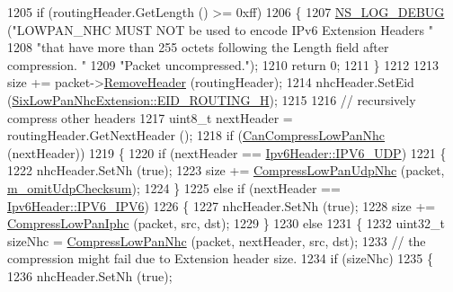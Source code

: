 \begin{DoxyCode}
1205       \textcolor{keywordflow}{if} (routingHeader.GetLength () >= 0xff)
1206         \{
1207           \hyperlink{group__logging_ga413f1886406d49f59a6a0a89b77b4d0a}{NS\_LOG\_DEBUG} (\textcolor{stringliteral}{"LOWPAN\_NHC MUST NOT be used to encode IPv6 Extension Headers "}
1208                         \textcolor{stringliteral}{"that have more than 255 octets following the Length field after compression. "}
1209                         \textcolor{stringliteral}{"Packet uncompressed."});
1210           \textcolor{keywordflow}{return} 0;
1211         \}
1212 
1213       size += packet->\hyperlink{classns3_1_1Packet_a0961eccf975d75f902d40956c93ba63e}{RemoveHeader} (routingHeader);
1214       nhcHeader.SetEid (\hyperlink{classns3_1_1SixLowPanNhcExtension_ac692a22abe80c30bcbafa57ef36bf5adaeb4cdb5e404fc0a43e7ea60be5f24b40}{SixLowPanNhcExtension::EID\_ROUTING\_H});
1215 
1216       \textcolor{comment}{// recursively compress other headers}
1217       uint8\_t nextHeader = routingHeader.GetNextHeader ();
1218       \textcolor{keywordflow}{if} (\hyperlink{classns3_1_1SixLowPanNetDevice_a44cfa681aaac7a83c160e9cdfc90d7e0}{CanCompressLowPanNhc} (nextHeader))
1219         \{
1220           \textcolor{keywordflow}{if} (nextHeader == \hyperlink{classns3_1_1Ipv6Header_a226429221a066c5e3b1f260caf27d1e9aef42146d6b211521c22f827b04530253}{Ipv6Header::IPV6\_UDP})
1221             \{
1222               nhcHeader.SetNh (\textcolor{keyword}{true});
1223               size += \hyperlink{classns3_1_1SixLowPanNetDevice_aa163cb1c6e2c82e208692f9bae9b5189}{CompressLowPanUdpNhc} (packet, 
      \hyperlink{classns3_1_1SixLowPanNetDevice_aa3503adbbb86b19e4ec2d17f3c8436f7}{m\_omitUdpChecksum});
1224             \}
1225           \textcolor{keywordflow}{else} \textcolor{keywordflow}{if} (nextHeader == \hyperlink{classns3_1_1Ipv6Header_a226429221a066c5e3b1f260caf27d1e9a2438a09074916d0e066627b28543ec7a}{Ipv6Header::IPV6\_IPV6})
1226             \{
1227               nhcHeader.SetNh (\textcolor{keyword}{true});
1228               size += \hyperlink{classns3_1_1SixLowPanNetDevice_a67bf1501ba018d90c5bdb442371a3722}{CompressLowPanIphc} (packet, src, dst);
1229             \}
1230           \textcolor{keywordflow}{else}
1231             \{
1232               uint32\_t sizeNhc = \hyperlink{classns3_1_1SixLowPanNetDevice_a41d34fd1612e7e6911614fadfef6ab67}{CompressLowPanNhc} (packet, nextHeader, src, dst);
1233               \textcolor{comment}{// the compression might fail due to Extension header size.}
1234               \textcolor{keywordflow}{if} (sizeNhc)
1235                 \{
1236                   nhcHeader.SetNh (\textcolor{keyword}{true});

\end{DoxyCode}
